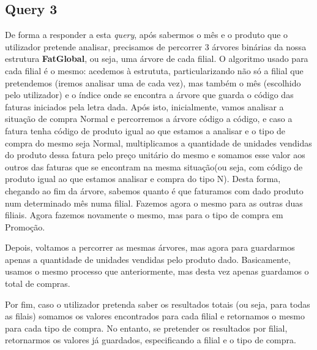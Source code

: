 \documentclass{article}
\begin{document}
\subsection{Query 3}

\noindent{}
\vspace{1cm}

\par\noindent\hspace{0.52cm}De forma a responder a esta \textit{query}, após sabermos o mês e o produto que o utilizador pretende analisar, precisamos de percorrer 3 árvores binárias da nossa estrutura \textbf{FatGlobal}, ou seja, uma árvore de cada filial. O algoritmo usado para cada filial é o mesmo: acedemos à estrututa, particularizando não só a filial que pretendemos (iremos analisar uma de cada vez), mas também o mês (escolhido pelo utilizador) e o índice onde se encontra a árvore que guarda o código das faturas iniciados pela letra dada. Após isto, inicialmente, vamos analisar a situação de compra Normal e percorremos a árvore código a código, e caso a fatura tenha código de produto igual ao que estamos a analisar e o tipo de compra do mesmo seja Normal, multiplicamos a quantidade de unidades vendidas do produto dessa fatura pelo preço unitário do mesmo e somamos esse valor aos outros das faturas que se encontram na mesma situação(ou seja, com código de produto igual ao que estamos analisar e compra do tipo N). Desta forma, chegando ao fim da árvore, sabemos quanto é que faturamos com dado produto num determinado mês numa filial. Fazemos agora o mesmo para as outras duas filiais.  Agora fazemos novamente o mesmo, mas para o tipo de compra em Promoção.
\par Depois, voltamos a percorrer as mesmas árvores, mas agora para guardarmos apenas a quantidade de unidades vendidas pelo produto dado. Basicamente, usamos o mesmo processo que anteriormente, mas desta vez apenas guardamos o total de compras.
\par Por fim, caso o utilizador pretenda saber os resultados totais (ou seja, para todas as filais) somamos os valores encontrados para cada filial e retornamos o mesmo para cada tipo de compra. No entanto, se pretender os resultados por filial, retornarmos os valores já guardados, especificando a filial e o tipo de compra.
\end{document}
